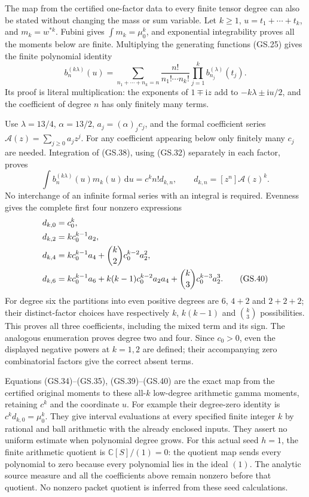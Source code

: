 \documentclass[11pt]{article}
\newcommand{\ii}{\mathrm i}
\newcommand{\dd}{\,\mathrm d}
\begin{document}
The map from the certified one-factor data to every finite tensor
degree can also be stated without changing the mass or sum variable.
Let $k\ge1$, $u=t_1+\cdots+t_k$, and $m_k=w^{*k}$. Fubini
gives $\int m_k=\mu_0^k$, and exponential integrability proves
all the moments below are finite. Multiplying the generating
functions (GS.25) gives the finite polynomial identity
\begin{equation}
 b_n^{(k\lambda)}(u)=
 \sum_{n_1+\cdots+n_k=n}\frac{n!}{n_1!\cdots n_k!}
                     \prod_{j=1}^k b_{n_j}^{(\lambda)}(t_j).
 \tag{GS.38}
\end{equation}
Its proof is literal multiplication: the exponents of $1\mp\ii z$
add to $-k\lambda\pm\ii u/2$, and the coefficient of degree
$n$ has only finitely many terms.

Use $\lambda=13/4$, $\alpha=13/2$, $a_j=(\alpha)_j c_j$, and
the formal coefficient series $\mathcal A(z)=\sum_{j\ge0}a_jz^j$.
For any coefficient appearing below only finitely many $c_j$ are
needed. Integration of (GS.38), using (GS.32) separately in each
factor, proves
\begin{equation}
 \int b_n^{(k\lambda)}(u)m_k(u)\dd u
 =c^k n!d_{k,n},\qquad d_{k,n}=[z^n]\mathcal A(z)^k.
 \tag{GS.39}
\end{equation}
No interchange of an infinite formal series with an integral is
required. Evenness gives the complete first four nonzero expressions
\begin{align}
 d_{k,0}&=c_0^k,\notag\\
 d_{k,2}&=k c_0^{k-1}a_2,\notag\\
 d_{k,4}&=k c_0^{k-1}a_4+\binom{k}{2}c_0^{k-2}a_2^2,\notag\\
 d_{k,6}&=k c_0^{k-1}a_6+k(k-1)c_0^{k-2}a_2a_4
                  +\binom{k}{3}c_0^{k-3}a_2^3.
 \tag{GS.40}
\end{align}
For degree six the partitions into even positive degrees are
$6$, $4+2$ and $2+2+2$; their distinct-factor choices have respectively
$k$, $k(k-1)$ and $\binom{k}{3}$ possibilities. This proves all
three coefficients, including the mixed term and its sign.
The analogous enumeration proves degree two and four. Since
$c_0>0$, even the displayed negative powers at $k=1,2$ are defined;
their accompanying zero combinatorial factors give the correct
absent terms.

Equations (GS.34)--(GS.35), (GS.39)--(GS.40) are the exact map
from the certified original moments to these all-$k$ low-degree
arithmetic gamma moments, retaining $c^k$ and the coordinate $u$.
For example their degree-zero identity is $c^k d_{k,0}=\mu_0^k$.
They give interval evaluations at every specified finite integer $k$
by rational and ball arithmetic with the already enclosed inputs.
They assert no uniform estimate when polynomial degree grows.
For this actual seed $h=1$, the finite arithmetic quotient is
$\mathbb C[S]/(1)=0$: the quotient map sends every polynomial to
zero because every polynomial lies in the ideal $(1)$. The analytic
source measure and all the coefficients above remain nonzero before
that quotient. No nonzero packet quotient is inferred from these
seed calculations.
\end{document}
